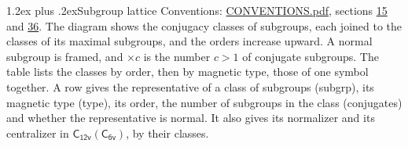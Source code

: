 \documentclass[10pt,a4paper]{article}
\makeatletter
\renewcommand\section{\@startsection{section}{1}{\z@}{-3ex plus -1ex minus -.2ex}%
  {1.2ex plus .2ex}{\normalfont\large\sffamily\bfseries\color{parttitle}}}
\numberwithin{equation}{section}
\newcommand{\grp}[1]{\mathsf{#1}}
\makeatother
\begin{document}
\section{Subgroup lattice}\label{s:subgroups}
Conventions: \href{../../CONVENTIONS.pdf}{CONVENTIONS.pdf}, sections \href{../../../rotation/CONVENTIONS.pdf\#conv.15}{15} and \href{../../CONVENTIONS.pdf\#conv.36}{36}.
The diagram shows the conjugacy classes of subgroups, each joined to the classes of its maximal subgroups, and the orders increase upward. \label{n:index.conjugates.c}\label{n:mark.conjugates}A normal subgroup is framed, and ${\times}c$ is the number $c > 1$ of conjugate subgroups. The table lists the classes by order, then by magnetic type, those of one symbol together. \label{n:head.subgroup}\label{n:head.magnetic.type}\label{n:head.order}\label{n:head.conjugates}\label{n:head.normal}A row gives the representative of a class of subgroups (subgrp), its magnetic type (type), its order, the number of subgroups in the class (conjugates) and whether the representative is normal. \label{n:head.normalizer}\label{n:head.centralizer}It also gives its normalizer and its centralizer in $\grp{C_{12v}}(\grp{C_{6v}})$, by their classes. 
\end{document}
